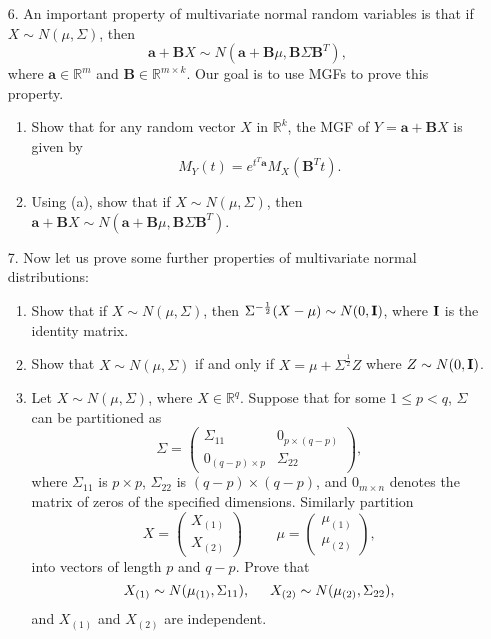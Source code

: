 \documentclass[11pt]{article}
\begin{document}
\begin{enumerate}
\item[6.] An important property of multivariate normal random variables is that if $X \sim N(\mu, \Sigma)$, then
$$\bm{a} + \bm{B} X \sim N(\bm{a} + \bm{B} \mu, \bm{B} \Sigma \bm{B}^T),$$
where $\bm{a} \in \mathbb{R}^m$ and $\bm{B} \in \mathbb{R}^{m \times k}$. Our goal is to use MGFs to prove this property.

\begin{enumerate}
\item Show that for any random vector $X$ in $\mathbb{R}^k$, the MGF of $Y = \bm{a} + \bm{B} X$ is given by
$$M_Y(t) = e^{t^T \bm{a}} M_X(\bm{B}^T t).$$

\item Using (a), show that if $X \sim N(\mu, \Sigma)$, then $\bm{a} + \bm{B} X \sim N(\bm{a} + \bm{B} \mu, \bm{B} \Sigma \bm{B}^T)$.
\end{enumerate}


\item[7.] Now let us prove some further properties of multivariate normal distributions:

\begin{enumerate}

\item Show that if $X \sim N(\mu, \Sigma)$, then $\Sigma^{-\frac{1}{2}} (X - \mu) \sim N(0, {\bf I})$, where ${\bf I}$ is the identity matrix.

\item Show that $X \sim N(\mu, \Sigma)$ if and only if $X = \mu + \Sigma^{\frac{1}{2}} Z$ where $Z \sim N(0, {\bf I})$.

\item Let $X \sim N(\mu, \Sigma)$, where $X \in \mathbb{R}^q$. Suppose that for some $1 \leq p < q$, $\Sigma$ can be partitioned as
$$\Sigma = \begin{pmatrix}
\Sigma_{11} & 0_{p \times (q - p)} \\
0_{(q - p) \times p} & \Sigma_{22}
\end{pmatrix},$$
where $\Sigma_{11}$ is $p \times p$, $\Sigma_{22}$ is $(q - p) \times (q - p)$, and $0_{m \times n}$ denotes the matrix of zeros of the specified dimensions. Similarly partition 
$$X = \begin{pmatrix}
X_{(1)} \\
X_{(2)}
\end{pmatrix} \hspace{1cm} \mu = \begin{pmatrix}
\mu_{(1)} \\
\mu_{(2)}
\end{pmatrix},$$
into vectors of length $p$ and $q - p$. Prove that 
$$X_{(1)} \sim N(\mu_{(1)}, \Sigma_{11}), \hspace{0.5cm} X_{(2)} \sim N(\mu_{(2)}, \Sigma_{22}),$$
and $X_{(1)}$ and $X_{(2)}$ are independent.


\end{enumerate}
\end{enumerate}
\end{document}
